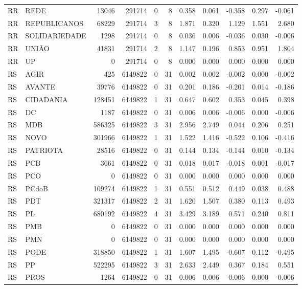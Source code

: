 \begin{landscape}
\begin{longtable}{llrrrrrrrrr}
RR & REDE & 13046 & 291714 & 0 & 8 & 0.358 & 0.061 & -0.358 & 0.297 & -0.061 \\
RR & REPUBLICANOS & 68229 & 291714 & 3 & 8 & 1.871 & 0.320 & 1.129 & 1.551 & 2.680 \\
RR & SOLIDARIEDADE & 1298 & 291714 & 0 & 8 & 0.036 & 0.006 & -0.036 & 0.030 & -0.006 \\
RR & UNIÃO & 41831 & 291714 & 2 & 8 & 1.147 & 0.196 & 0.853 & 0.951 & 1.804 \\
RR & UP & 0 & 291714 & 0 & 8 & 0.000 & 0.000 & 0.000 & 0.000 & 0.000 \\
RS & AGIR & 425 & 6149822 & 0 & 31 & 0.002 & 0.002 & -0.002 & 0.000 & -0.002 \\
RS & AVANTE & 39776 & 6149822 & 0 & 31 & 0.201 & 0.186 & -0.201 & 0.014 & -0.186 \\
RS & CIDADANIA & 128451 & 6149822 & 1 & 31 & 0.647 & 0.602 & 0.353 & 0.045 & 0.398 \\
RS & DC & 1187 & 6149822 & 0 & 31 & 0.006 & 0.006 & -0.006 & 0.000 & -0.006 \\
RS & MDB & 586325 & 6149822 & 3 & 31 & 2.956 & 2.749 & 0.044 & 0.206 & 0.251 \\
RS & NOVO & 301966 & 6149822 & 1 & 31 & 1.522 & 1.416 & -0.522 & 0.106 & -0.416 \\
RS & PATRIOTA & 28516 & 6149822 & 0 & 31 & 0.144 & 0.134 & -0.144 & 0.010 & -0.134 \\
RS & PCB & 3661 & 6149822 & 0 & 31 & 0.018 & 0.017 & -0.018 & 0.001 & -0.017 \\
RS & PCO & 0 & 6149822 & 0 & 31 & 0.000 & 0.000 & 0.000 & 0.000 & 0.000 \\
RS & PCdoB & 109274 & 6149822 & 1 & 31 & 0.551 & 0.512 & 0.449 & 0.038 & 0.488 \\
RS & PDT & 321317 & 6149822 & 2 & 31 & 1.620 & 1.507 & 0.380 & 0.113 & 0.493 \\
RS & PL & 680192 & 6149822 & 4 & 31 & 3.429 & 3.189 & 0.571 & 0.240 & 0.811 \\
RS & PMB & 0 & 6149822 & 0 & 31 & 0.000 & 0.000 & 0.000 & 0.000 & 0.000 \\
RS & PMN & 0 & 6149822 & 0 & 31 & 0.000 & 0.000 & 0.000 & 0.000 & 0.000 \\
RS & PODE & 318850 & 6149822 & 1 & 31 & 1.607 & 1.495 & -0.607 & 0.112 & -0.495 \\
RS & PP & 522295 & 6149822 & 3 & 31 & 2.633 & 2.449 & 0.367 & 0.184 & 0.551 \\
RS & PROS & 1264 & 6149822 & 0 & 31 & 0.006 & 0.006 & -0.006 & 0.000 & -0.006 \\

\end{longtable}
\end{landscape}
